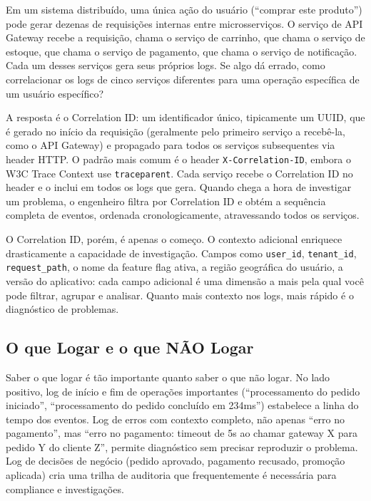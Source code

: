 Em um sistema distribuído, uma única ação do usuário (``comprar este
produto'') pode gerar dezenas de requisições internas entre microsserviços.
O serviço de API Gateway recebe a requisição, chama o serviço de carrinho, que
chama o serviço de estoque, que chama o serviço de pagamento, que chama o
serviço de notificação. Cada um desses serviços gera seus próprios logs. Se
algo dá errado, como correlacionar os logs de cinco serviços diferentes para
uma operação específica de um usuário específico?

A resposta é o Correlation ID: um identificador único, tipicamente um UUID,
que é gerado no início da requisição (geralmente pelo primeiro serviço a
recebê-la, como o API Gateway) e propagado para todos os serviços subsequentes
via header HTTP. O padrão mais comum é o header \texttt{X-Correlation-ID},
embora o W3C Trace Context use \texttt{traceparent}. Cada serviço recebe o
Correlation ID no header e o inclui em todos os logs que gera. Quando chega a
hora de investigar um problema, o engenheiro filtra por Correlation ID e obtém
a sequência completa de eventos, ordenada cronologicamente, atravessando todos
os serviços.

O Correlation ID, porém, é apenas o começo. O contexto adicional enriquece
drasticamente a capacidade de investigação. Campos como \texttt{user\_id},
\texttt{tenant\_id}, \texttt{request\_path}, o nome da feature flag ativa,
a região geográfica do usuário, a versão do aplicativo: cada campo adicional
é uma dimensão a mais pela qual você pode filtrar, agrupar e analisar. Quanto
mais contexto nos logs, mais rápido é o diagnóstico de problemas.

\subsection{O que Logar e o que NÃO Logar}

Saber o que logar é tão importante quanto saber o que não logar. No lado positivo,
log de início e fim de operações importantes (``processamento do pedido iniciado'',
``processamento do pedido concluído em 234ms'') estabelece a linha do tempo dos
eventos. Log de erros com contexto completo, não apenas ``erro no pagamento'',
mas ``erro no pagamento: timeout de 5s ao chamar gateway X para pedido Y do
cliente Z'', permite diagnóstico sem precisar reproduzir o problema. Log de
decisões de negócio (pedido aprovado, pagamento recusado, promoção aplicada) cria
uma trilha de auditoria que frequentemente é necessária para compliance e
investigações.

